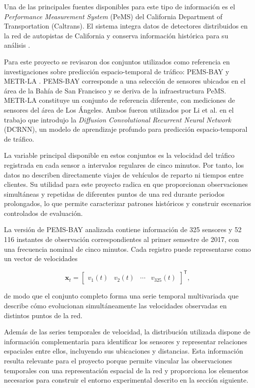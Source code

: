 \documentclass[11pt]{article}
\begin{document}
Una de las principales fuentes disponibles para este tipo de información es
el \textit{Performance Measurement System} (PeMS) del California Department of
Transportation (Caltrans). El sistema integra datos de detectores distribuidos
en la red de autopistas de California y conserva información histórica para su
análisis \citep{caltrans_pems}.

Para este proyecto se revisaron dos conjuntos utilizados como referencia en
investigaciones sobre predicción espacio-temporal de tráfico: PEMS-BAY y
METR-LA \citep{li2018dcrnn}. PEMS-BAY corresponde a una selección de
sensores ubicados en el área de la Bahía de San Francisco y se deriva de la
infraestructura PeMS. METR-LA constituye un conjunto de referencia diferente,
con mediciones de sensores del área de Los Ángeles. Ambos fueron utilizados
por Li et al. en el trabajo que introdujo la \textit{Diffusion Convolutional
Recurrent Neural Network} (DCRNN), un modelo de aprendizaje profundo para
predicción espacio-temporal de tráfico.

La variable principal disponible en estos conjuntos es la velocidad del
tráfico registrada en cada sensor a intervalos regulares de cinco minutos.
Por tanto, los datos no describen directamente viajes de vehículos de reparto
ni tiempos entre clientes. Su utilidad para este proyecto radica en que
proporcionan observaciones simultáneas y repetidas de diferentes puntos de
una red durante periodos prolongados, lo que permite caracterizar patrones
históricos y construir escenarios controlados de evaluación.

La versión de PEMS-BAY analizada contiene información de 325 sensores y
52\,116 instantes de observación correspondientes al primer semestre de 2017,
con una frecuencia nominal de cinco minutos. Cada registro puede representarse
como un vector de velocidades

\[
\mathbf{x}_t=
\begin{bmatrix}
v_1(t) & v_2(t) & \cdots & v_{325}(t)
\end{bmatrix}^{\mathsf T},
\]

de modo que el conjunto completo forma una serie temporal multivariada que
describe cómo evolucionan simultáneamente las velocidades observadas en
distintos puntos de la red.

Además de las series temporales de velocidad, la distribución utilizada
dispone de información complementaria para identificar los sensores y
representar relaciones espaciales entre ellos, incluyendo sus ubicaciones y
distancias. Esta información resulta relevante para el proyecto porque
permite vincular las observaciones temporales con una representación espacial
de la red y proporciona los elementos necesarios para construir el entorno
experimental descrito en la sección siguiente.
\end{document}
